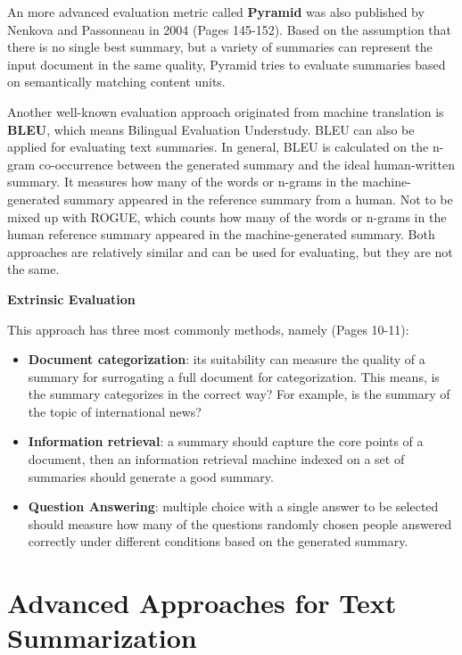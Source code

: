 An more advanced evaluation metric called \textbf{Pyramid} was also published by Nenkova and Passonneau in 2004 \cite{nenkova-passonneau-2004-evaluating} (Pages 145-152). Based on the assumption that there is no single best summary, but a variety of summaries can represent the input document in the same quality, Pyramid tries to evaluate summaries based on semantically matching content units. 

Another well-known evaluation approach originated from machine translation is \textbf{BLEU}, which means Bilingual Evaluation Understudy. BLEU can also be applied for evaluating text summaries. In general, BLEU is calculated on the n-gram co-occurrence between the generated summary and the ideal human-written summary. It measures how many of the words or n-grams in the machine-generated summary appeared in the reference summary from a human. Not to be mixed up with ROGUE, which counts how many of the words or n-grams in the human reference summary appeared in the machine-generated summary. Both approaches are relatively similar and can be used for evaluating, but they are not the same.

\textbf{Extrinsic Evaluation}

This approach has three most commonly methods, namely \cite{journals/cai/SteinbergerJ09} (Pages 10-11):

\begin{itemize}
	\item \textbf{Document categorization}: its suitability can measure the quality of a summary for surrogating a full document for categorization. This means, is the summary categorizes in the correct way? For example, is the summary of the topic of international news? 
	\item \textbf{Information retrieval}: a summary should capture the core points of a document, then an information retrieval machine indexed on a set of summaries should generate a good summary. 
	\item \textbf{Question Answering}: multiple choice with a single answer to be selected should measure how many of the questions randomly chosen people answered correctly under different conditions based on the generated summary.
\end{itemize}

\section{Advanced Approaches for Text Summarization}\label{ss:trends}


